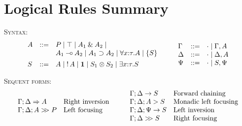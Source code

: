 \documentclass{sig-alt}
\begin{document}
\onecolumn

\def\CLFRIseq#1#2#3{#1;#2\Rightarrow#3}
\def\CLFLFseq#1#2#3#4{#1;#2;#3\mathrel{>\!\! >}#4}
\def\CLFLseq#1#2#3{#1;#2\rightarrow#3}
\def\CLFLLFseq#1#2#3#4{#1;#2;#3\mathrel>#4}
\def\CLFLIseq#1#2#3#4{#1;#2;#3\rightarrow#4}
\def\CLFRFseq#1#2#3{#1;#2\mathrel{>\!\! >}#3}


\section{Logical Rules Summary}

\vspace{0.25cm}

\noindent \textsc{Syntax:}
$$
\begin{array}{lll}
A & ::= &  P 
      \mid \top 
      \mid A_1 \with A_2 
      \mid \\&& A_1 \limp A_2 
      \mid A_1 \iimp A_2 
      \mid \forall x{:}\tau.A  
      \mid \{ S \} 
\\[1ex]
S & ::= &  A
      \mid \bang A
      \mid \one 
      \mid S_1 \tensor S_2 
      \mid \exists x{:}\tau.S 
\end{array}
\qquad
\begin{array}{lll}
  \Gamma & ::= & \cdot \mid \Gamma, A \\
  \Delta & ::= & \cdot \mid \Delta, A \\%
  \Psi   & ::= & \cdot \mid S, \Psi \\
\end{array}
$$

\noindent \textsc{Sequent forms:}
$$
\begin{array}{ll}
  \CLFRIseq{\Gamma}{\Delta}{A} & \hbox{Right inversion} \\
  \CLFLFseq{\Gamma}{\Delta}{A}{P} & \hbox{Left focusing} \\
\end{array}
\qquad
\begin{array}{ll}
  \CLFLseq{\Gamma}{\Delta}{S} & \hbox{Forward chaining} \\
  \CLFLLFseq{\Gamma}{\Delta}{A}{S} & \hbox{Monadic left focusing} \\
  \CLFLIseq{\Gamma}{\Delta}{\Psi}{S} & \hbox{Left inversion} \\
  \CLFRFseq{\Gamma}{\Delta}{S} & \hbox{Right focusing} \\
\end{array}
$$
\end{document}

